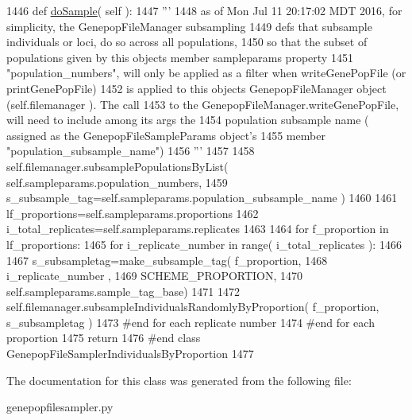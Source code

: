 \begin{DoxyCode}
1446     \textcolor{keyword}{def }\hyperlink{classnegui_1_1genepopfilesampler_1_1GenepopFileSamplerIndividualsByProportion_ad8170ea6661afa7bff72d484372209e3}{doSample}( self ):
1447         \textcolor{stringliteral}{'''}
1448 \textcolor{stringliteral}{        as of Mon Jul 11 20:17:02 MDT 2016, for simplicity, the GenepopFileManager subsampling}
1449 \textcolor{stringliteral}{        defs that subsample individuals or loci, do so across all populations,}
1450 \textcolor{stringliteral}{        so that the subset of populations given by this objects member sampleparams property }
1451 \textcolor{stringliteral}{        "population\_numbers", will only be applied as a filter when writeGenePopFile (or printGenePopFile)}
1452 \textcolor{stringliteral}{        is applied to this objects GenepopFileManager object (self.filemanager ). The call}
1453 \textcolor{stringliteral}{        to the GenepopFileManager.writeGenePopFile, will need to include among its args the }
1454 \textcolor{stringliteral}{        population subsample name ( assigned as the GenepopFileSampleParams object's}
1455 \textcolor{stringliteral}{        member "population\_subsample\_name") }
1456 \textcolor{stringliteral}{        '''}
1457 
1458         self.filemanager.subsamplePopulationsByList( self.sampleparams.population\_numbers, 
1459                 s\_subsample\_tag=self.sampleparams.population\_subsample\_name )
1460 
1461         lf\_proportions=self.sampleparams.proportions
1462         i\_total\_replicates=self.sampleparams.replicates
1463 
1464         \textcolor{keywordflow}{for} f\_proportion \textcolor{keywordflow}{in} lf\_proportions:
1465             \textcolor{keywordflow}{for} i\_replicate\_number \textcolor{keywordflow}{in} range( i\_total\_replicates ):
1466 
1467                 s\_subsampletag=make\_subsample\_tag(  f\_proportion, 
1468                                                     i\_replicate\_number , 
1469                                                     SCHEME\_PROPORTION,
1470                                                     self.sampleparams.sample\_tag\_base)
1471 
1472                 self.filemanager.subsampleIndividualsRandomlyByProportion( f\_proportion, s\_subsampletag ) 
1473             \textcolor{comment}{#end for each replicate number  }
1474         \textcolor{comment}{#end for each proportion}
1475         \textcolor{keywordflow}{return}
1476 \textcolor{comment}{#end class GenepopFileSamplerIndividualsByProportion}
1477 
\end{DoxyCode}


The documentation for this class was generated from the following file\+:\begin{DoxyCompactItemize}
\item 
genepopfilesampler.\+py\end{DoxyCompactItemize}
